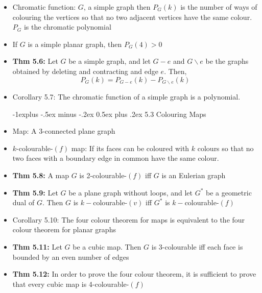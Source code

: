 \documentclass[10pt,landscape]{article}
\makeatletter
\renewcommand{\subsection}{\@startsection{subsection}{2}{0mm}%
                                {-1explus -.5ex minus -.2ex}%
                                {0.5ex plus .2ex}%
                                {\normalfont\normalsize\bfseries}}
\makeatother
\begin{document}
\begin{multicols}{2}
\begin{itemize}
    \subsection{5.2 Chromatic Polynomials}
    \item Chromatic function: $G$, a simple graph then $P_G(k)$ is the number of ways of colouring the vertices so that no two adjacent vertices have the same colour. $P_G$ is the chromatic polynomial
    \item If $G$ is a simple planar graph, then $P_G(4)>0$
    \item \textbf{Thm 5.6:} Let $G$ be a simple graph, and let $G-e$ and $G\backslash e$ be the graphs obtained by deleting and contracting and edge $e$. Then, \\
    $$P_G(k)=P_{G-e}(k)-P_{G\backslash e}(k)$$
    \item Corollary 5.7: The chromatic function of a simple graph is a polynomial.

    \subsection{5.3 Colouring Maps}
    \item Map: A 3-connected plane graph
    \item $k$-colourable-$(f)$ map: If its faces can be coloured with $k$ colours so that no two faces with a boundary edge in common have the same colour.
    \item \textbf{Thm 5.8:} A map $G$ is 2-colourable-$(f)$ iff $G$ is an Eulerian graph
    \item \textbf{Thm 5.9:} Let $G$ be a plane graph without loops, and let $G^*$ be a geometric dual of $G$. Then $G$ is $k-$colourable-$(v)$ iff $G^*$ is $k-$colourable-$(f)$
    \item Corollary 5.10: The four colour theorem for maps is equivalent to the four colour theorem for planar graphs
    \item \textbf{Thm 5.11:} Let $G$ be a cubic map. Then $G$ is 3-colourable iff each face is bounded by an even number of edges
    \item \textbf{Thm 5.12:} In order to prove the four colour theorem, it is sufficient to prove that every cubic map is 4-colourable-$(f)$

\end{itemize}
\end{multicols}
\end{document}
